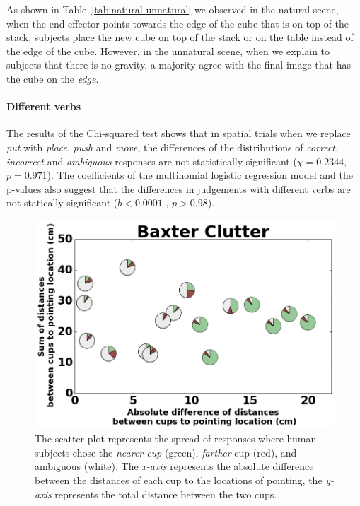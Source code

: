As shown in Table~\ref{tab:natural-unnatural} we observed in the natural scene, when the end-effector points towards the edge of the cube that is on top of the stack, subjects place the new cube on top of the stack or on the table instead of the edge of the cube. However, in the unnatural scene, when we explain to subjects that there is no gravity, a majority agree with the final image that has the cube on the \textit{edge}.


\paragraph{Different verbs}
The results of the Chi-squared test shows that in spatial trials when we replace \textit{put} with \textit{place}, \textit{push} and \textit{move}, the differences of the distributions of \textit{correct}, \textit{incorrect} and \textit{ambiguous} responses are not statistically significant ($\chi=0.2344 $, $p = 0.971$). The coefficients of the multinomial logistic regression model and the p-values also suggest that the differences in judgements 
with different verbs are not statically significant ($b<0.0001$ , $p>0.98$).


\begin{figure}[ht]
    \centering
    \includegraphics[width=\linewidth]{figures/baxter_Clutter_granular.png}
    \caption{The scatter plot represents the spread of responses where human subjects chose the \textit{nearer cup} (green), \textit{farther} cup (red), and ambiguous (white). The \textit{x-axis} represents the absolute difference between the distances of each cup to the locations of pointing, the \textit{y-axis} represents the total distance between the two cups.}
    \label{fig:cluttered}
\end{figure}
